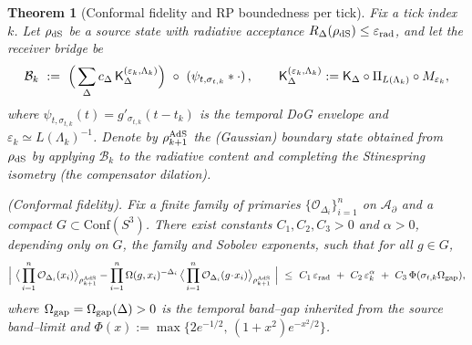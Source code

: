 \documentclass[10pt]{article}
\theoremstyle{definition}
\theoremstyle{plain}
\newtheorem{theorem}{Theorem}[section]
\begin{document}
\begin{theorem}[Conformal fidelity and RP boundedness per tick]\label{thm:tick-fidelity-RP}
Fix a tick index $k$. Let $\rho_{\rm dS}$ be a source state with radiative acceptance $R_\Delta(\rho_{\rm dS})\le \varepsilon_{\rm rad}$, and let the receiver bridge be
\[
\mathcal B_k\ :=\ \Big(\sum_\Delta c_\Delta\,{\sf K}_\Delta^{(\varepsilon_k,\Lambda_k)}\Big)\ \circ\ (\psi_{t,\sigma_{t,k}}*\cdot)\,,
\qquad {\sf K}_\Delta^{(\varepsilon_k,\Lambda_k)}:={\sf K}_\Delta\circ \Pi_{L(\Lambda_k)}\circ M_{\varepsilon_k},
\]
where $\psi_{t,\sigma_{t,k}}(t)=g'_{\sigma_{t,k}}(t-t_k)$ is the temporal DoG envelope and $\varepsilon_k\simeq L(\Lambda_k)^{-1}$. Denote by $\rho_{k+1}^{\rm AdS}$ the (Gaussian) boundary state obtained from $\rho_{\rm dS}$ by applying $\mathcal B_k$ to the radiative content and completing the Stinespring isometry (the compensator dilation).

\smallskip
\emph{(Conformal fidelity).}
Fix a finite family of primaries $\{\mathcal O_{\Delta_i}\}_{i=1}^n$ on $\mathcal A_\partial$ and a compact $G\subset\mathrm{Conf}(S^3)$. There exist constants $C_1,C_2,C_3>0$ and $\alpha>0$, depending only on $G$, the family and Sobolev exponents, such that for all $g\in G$,
\begin{equation}\label{eq:conf-fid-bound}
\Bigl|\ \big\langle \prod_{i=1}^n \mathcal O_{\Delta_i}(x_i)\big\rangle_{\rho_{k+1}^{\rm AdS}}
-\prod_{i=1}^n \Omega(g,x_i)^{-\Delta_i}\,
\big\langle \prod_{i=1}^n \mathcal O_{\Delta_i}(g\!\cdot\!x_i)\big\rangle_{\rho_{k+1}^{\rm AdS}}\ \Bigr|
\ \le\ C_1\,\varepsilon_{\rm rad}\ +\ C_2\,\varepsilon_k^\alpha\ +\ C_3\,\Phi(\sigma_{t,k}\Omega_{\rm gap}),
\end{equation}
where $\Omega_{\rm gap}=\Omega_{\rm gap}(\Delta)>0$ is the temporal band--gap inherited from the source band--limit and
$\Phi(x):=\max\{2e^{-1/2},\, (1+x^2)e^{-x^2/2}\}$.


\end{theorem}
\end{document}
